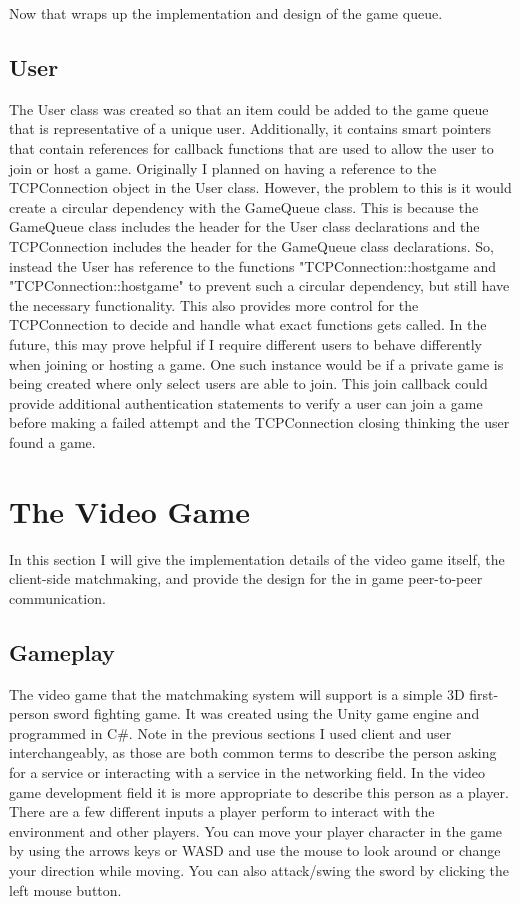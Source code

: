 \documentclass[conference]{IEEEtran}
\begin{document}
Now that wraps up the implementation and design of the game queue.

\subsection{User}
The User class was created so that an item could be added to the game queue that is representative of a unique user.
Additionally, it contains smart pointers that contain references for callback functions that are used to allow the user to join or host a game.
Originally I planned on having a reference to the TCPConnection object in the User class.
However, the problem to this is it would create a circular dependency with the GameQueue class.
This is because the GameQueue class includes the header for the User class declarations and the TCPConnection includes the header for the GameQueue class declarations.
So, instead the User has reference to the functions "TCPConnection::host\textunderscore game and "TCPConnection::host\textunderscore game" to prevent such a circular dependency, but still have the necessary functionality.
This also provides more control for the TCPConnection to decide and handle what exact functions gets called.
In the future, this may prove helpful if I require different users to behave differently when joining or hosting a game.
One such instance would be if a private game is being created where only select users are able to join.
This join callback could provide additional authentication statements to verify a user can join a game before making a failed attempt and the TCPConnection closing thinking the user found a game.

\section{The Video Game}
In this section I will give the implementation details of the video game itself, the client-side matchmaking, and provide the design for the in game peer-to-peer communication.
\subsection{Gameplay}
The video game that the matchmaking system will support is a simple 3D first-person sword fighting game.
It was created using the Unity game engine and programmed in C\#.
Note in the previous sections I used  client and user interchangeably, as those are both common terms to describe the person asking for a service or interacting with a service in the networking field.
In the video game development field it is more appropriate to describe this person as a player.
There are a few different inputs a player perform to interact with the environment and other players.
You can move your player character in the game by using the arrows keys or WASD and use the mouse to look around or change your direction while moving.
You can also attack/swing the sword by clicking the left mouse button.
\end{document}
